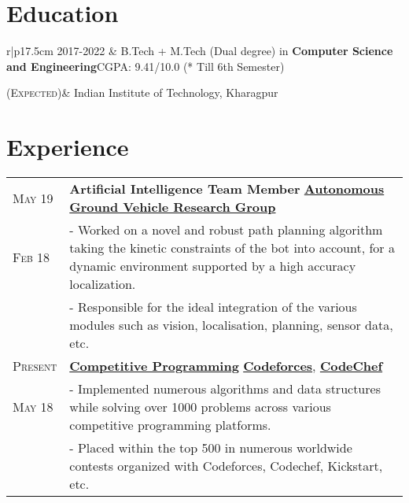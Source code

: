 \documentclass[a4paper,10pt]{extarticle} %
\begin{document}
\section{\textcolor{primary}{Education}}
\begin{tabular}{r|p{17.5cm}}	
2017-2022 & B.Tech + M.Tech (Dual degree) in \textbf{Computer Science and Engineering}\hfill\textsc{CGPA: } 9.41/10.0 (* Till 6th Semester)\\
\vspace{0.2cm}

\textsc{(Expected)}& Indian Institute of Technology, Kharagpur \hfill\\

\end{tabular}

\vspace{-0.35cm}
\section{\textcolor{primary}{Experience}}
\begin{tabularx}{\linewidth}{ l | X }
\textsc{May 19} & \textbf{Artificial Intelligence Team Member} \hfill\href{http://www.agv.iitkgp.ac.in/}{\textbf{Autonomous Ground Vehicle Research Group}}\\
\textsc{Feb 18} & {- Worked on a novel and robust path planning algorithm taking the kinetic constraints of the bot into account, for a dynamic environment supported by a high accuracy localization.}\\
\vspace{0.1cm}
& {- Responsible for the ideal integration of the various modules such as vision, localisation, planning, sensor data, etc.} \\
\textsc{Present} & \href{https://github.com/TheLethalCode/Competitive-Programming}{\textbf{Competitive Programming}} \hfill\href{https://codeforces.com/profile/TheLethalCode}{\textbf{Codeforces}}, \href{https://www.codechef.com/users/thelethalcode}{\textbf{CodeChef}}\\
\textsc{May 18} & {- Implemented numerous algorithms and data structures while solving over 1000 problems across various competitive programming platforms.}\\
& {- Placed within the top 500 in numerous worldwide contests organized with Codeforces, Codechef, Kickstart, etc. }
\end{tabularx}
\end{document}

